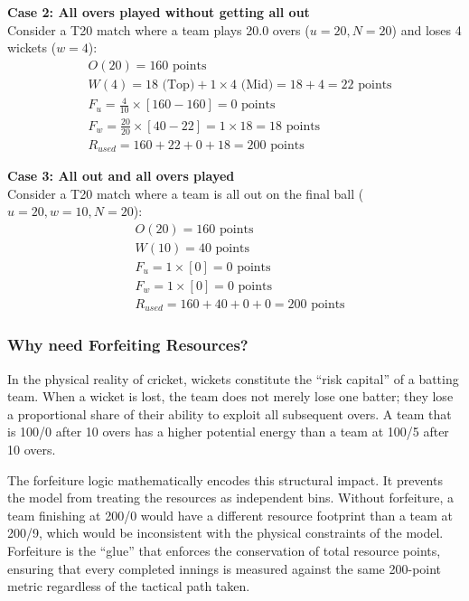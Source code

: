\documentclass[12pt, letterpaper, fleqn]{article}
\begin{document}
\noindent \textbf{Case 2: All overs played without getting all out} \\
\indent Consider a T20 match where a team plays 20.0 overs ($u=20, N=20$) and loses 4 wickets ($w=4$):
\begin{align*}
& O(20) = 160 \text{ points} \\
& W(4) = 18 \text{ (Top)} + 1 \times 4 \text{ (Mid)} = 18 + 4 = 22 \text{ points} \\
& F_u = \frac{4}{10} \times [160 - 160] = 0 \text{ points} \\
& F_w = \frac{20}{20} \times [40 - 22] = 1 \times 18 = 18 \text{ points} \\
& R_{used} = 160 + 22 + 0 + 18 = 200 \text{ points}
\end{align*}

\noindent \textbf{Case 3: All out and all overs played} \\
\indent Consider a T20 match where a team is all out on the final ball ($u=20, w=10, N=20$):
\begin{align*}
& O(20) = 160 \text{ points} \\
& W(10) = 40 \text{ points} \\
& F_u = 1 \times [0] = 0 \text{ points} \\
& F_w = 1 \times [0] = 0 \text{ points} \\
& R_{used} = 160 + 40 + 0 + 0 = 200 \text{ points}
\end{align*}

\subsubsection{Why need Forfeiting Resources?}
\indent In the physical reality of cricket, wickets constitute the ``risk capital'' of a batting team. When a wicket is lost, the team does not merely lose one batter; they lose a proportional share of their ability to exploit all subsequent overs. A team that is 100/0 after 10 overs has a higher potential energy than a team at 100/5 after 10 overs. 

\indent The forfeiture logic mathematically encodes this structural impact. It prevents the model from treating the resources as independent bins. Without forfeiture, a team finishing at 200/0 would have a different resource footprint than a team at 200/9, which would be inconsistent with the physical constraints of the model. Forfeiture is the ``glue'' that enforces the conservation of total resource points, ensuring that every completed innings is measured against the same 200-point metric regardless of the tactical path taken.
\end{document}
